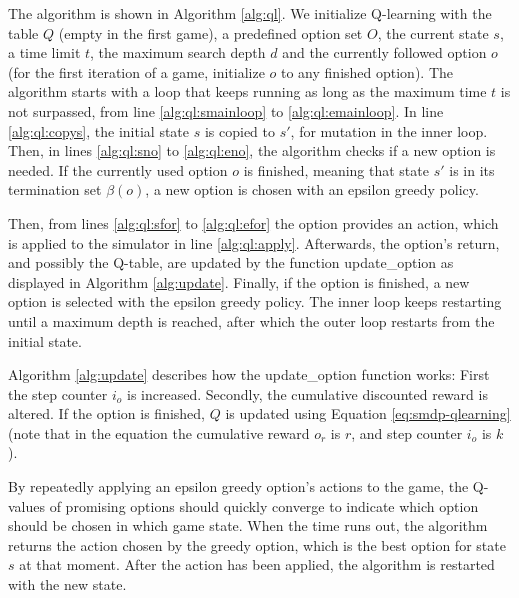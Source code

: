 The algorithm is shown in Algorithm \ref{alg:ql}. We initialize Q-learning with
the table $Q$ (empty in the first game), a predefined option set $O$, the
current state $s$, a time limit $t$, the maximum search depth $d$ and the
currently followed option $o$ (for the first iteration of a game, initialize $o$
to any finished option). The algorithm starts with a loop that keeps running as
long as the maximum time $t$ is not surpassed, from line \ref{alg:ql:smainloop}
to \ref{alg:ql:emainloop}. In line \ref{alg:ql:copys}, the initial state $s$ is
copied to $s'$, for mutation in the inner loop. Then, in lines \ref{alg:ql:sno}
to \ref{alg:ql:eno}, the algorithm checks if a new option is needed. If the
currently used option $o$ is finished, meaning that state $s'$ is in its
termination set $\beta(o)$, a new option is chosen with an epsilon greedy
policy. 

Then, from lines \ref{alg:ql:sfor} to \ref{alg:ql:efor} the option provides an
action, which is applied to the simulator in line \ref{alg:ql:apply}.
Afterwards, the option's return, and possibly the Q-table, are updated by the
function \textsf{update\_option} as displayed in Algorithm \ref{alg:update}.
Finally, if the option is finished, a new option is selected with the
epsilon greedy policy. The inner loop keeps restarting until a maximum depth is
reached, after which the outer loop restarts from the initial state.

Algorithm \ref{alg:update} describes how the \textsf{update\_option}
function works: First the step counter $i_o$ is increased. Secondly, the
cumulative discounted reward is altered. If the option is finished, $Q$ is
updated using Equation \ref{eq:smdp-qlearning} (note that in the equation the cumulative reward $o_r$
is $r$, and step counter $i_o$ is $k$).

By repeatedly applying an epsilon greedy option's actions to the game, the
Q-values of promising options should quickly converge to indicate which option
should be chosen in which game state. When the time runs out, the algorithm
returns the action chosen by the greedy option, which is the best option for
state $s$ at that moment. After the action has been applied, the algorithm is
restarted with the new state. 
